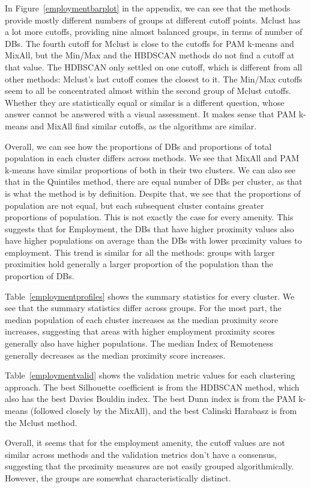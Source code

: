 \documentclass[11pt, a4paper]{article}
\begin{document}
In Figure~\ref{employmentbarplot} in the appendix, we can see that the methods provide mostly different numbers of groups at different cutoff points. Mclust has a lot more cutoffs, providing nine almost balanced groups, in terms of number of DBs. The fourth cutoff for Mclust is close to the cutoffs for PAM k-means and MixAll, but the Min/Max and the HBDSCAN methods do not find a cutoff at that value. The HDBSCAN only settled on one cutoff, which is different from all other methods: Mclust's last cutoff comes the closest to it. The Min/Max cutoffs seem to all be concentrated almost within the second group of Mclust cutoffs. Whether they are statistically equal or similar is a different question, whose answer cannot be answered with a visual assessment. It makes sense that PAM k-means and MixAll find similar cutoffs, as the algorithms are similar.
\par
Overall, we can see how the proportions of DBs and proportions of total population in each cluster differs across methods. We see that MixAll and PAM k-means have similar proportions of both in their two clusters. We can also see that in the Quintiles method, there are equal number of DBs per cluster, as that is what the method is by definition. Despite that, we see that the proportions of population are not equal, but each subsequent cluster contains greater proportions of population. This is not exactly the case for every amenity. This suggests that for Employment, the DBs that have higher proximity values also have higher populations on average than the DBs with lower proximity values to employment. This trend is similar for all the methods: groups with larger proximities hold generally a larger proportion of the population than the proportion of DBs.
\par
Table~\ref{employmentprofiles} shows the summary statistics for every cluster. We see that the summary statistics differ across groups. For the most part, the median population of each cluster increases as the median proximity score increases, suggesting that areas with higher employment proximity scores generally also have higher populations. The median Index of Remoteness generally decreases as the median proximity score increases.
\par
Table~\ref{employmentvalid} shows the validation metric values for each clustering approach. The best Silhouette coefficient is from the HDBSCAN method, which also has the best Davies Bouldin index. The best Dunn index is from the PAM k-means (followed closely by the MixAll), and the best Calinski Harabasz is from the Mclust method.
\par
Overall, it seems that for the employment amenity, the cutoff values are not similar across methods and the validation metrics don’t have a consensus, suggesting that the proximity measures are not easily grouped algorithmically. However, the groups are somewhat characteristically distinct.
\end{document}
